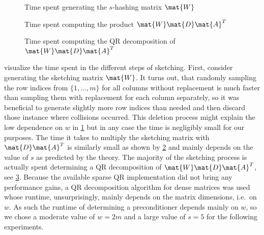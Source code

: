 \begin{figure}[tbp]
  \centering
  \caption{Time spent generating the \(s\)-hashing matrix \(\mat{W}\)}%
  \label{fig:generate_sketch_duration}
\end{figure}

\begin{figure}[tbp]
  \centering%
  \caption{Time spent computing the product \(\mat{W}\mat{D}\mat{A}^T\)}%
  \label{fig:sketching_duration}
\end{figure}

\begin{figure}[tbp]
  \centering%
  \caption{Time spent computing the QR decomposition of \(\mat{W}\mat{D}\mat{A}^T\)}%
  \label{fig:decomposition_duration}
\end{figure}

 visualize the time spent in the different steps of sketching.
First, consider generating the sketching matrix \(\mat{W}\).
It turns out, that randomly sampling the row indices from \(\{1, \ldots, m\}\) for all columns without replacement is much faster than sampling them with replacement for each column separately, so it was beneficial to generate slightly more row indices than needed and then discard those instance where collisions occurred.
This deletion process might explain the low dependence on \(w\) in \cref{fig:generate_sketch_duration} but in any case the time is negligibly small for our purposes.
The time it takes to multiply the sketching matrix with \(\mat{D}\mat{A}^T\) is similarly small as shown by \cref{fig:sketching_duration} and mainly depends on the value of \(s\) as predicted by the theory.
The majority of the sketching process is actually spent determining a QR decomposition of \(\mat{W}\mat{D}\mat{A}^T\), see \cref{fig:decomposition_duration}.
Because the available sparse QR implementation did not bring any performance gains, a QR decomposition algorithm for dense matrices was used whose runtime, unsurprisingly, mainly depends on the matrix dimensions, i.e.\ on \(w\).
As such the runtime of determining a preconditioner depends mainly on \(w\), so we chose a moderate value of \(w=2m\) and a large value of \(s=5\) for the following experiments.

